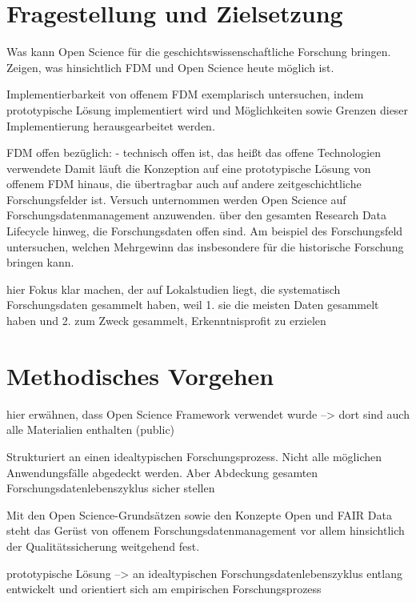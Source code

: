 \section{Fragestellung und Zielsetzung}

Was kann Open Science für die geschichtswissenschaftliche Forschung bringen. 
Zeigen, was hinsichtlich FDM und Open Science heute möglich ist.

Implementierbarkeit von offenem FDM exemplarisch untersuchen, indem prototypische Lösung implementiert wird und Möglichkeiten sowie Grenzen dieser Implementierung herausgearbeitet werden.   

FDM offen bezüglich:
- technisch offen ist, das heißt das offene Technologien verwendete
Damit läuft die Konzeption auf eine prototypische Lösung von offenem FDM hinaus, die übertragbar auch auf andere zeitgeschichtliche Forschungsfelder ist.
Versuch unternommen werden Open Science auf Forschungsdatenmanagement anzuwenden. über den gesamten Research Data Lifecycle hinweg, die Forschungsdaten offen sind. Am beispiel des Forschungsfeld untersuchen, welchen Mehrgewinn das insbesondere für die historische Forschung bringen kann. 

 hier Fokus klar machen, der auf Lokalstudien liegt, die systematisch Forschungsdaten gesammelt haben, weil 1. sie die meisten Daten gesammelt haben und 2. zum Zweck gesammelt, Erkenntnisprofit zu erzielen

\section{Methodisches Vorgehen}

hier erwähnen, dass Open Science Framework verwendet wurde --> dort sind auch alle Materialien enthalten (public)

Strukturiert an einen idealtypischen Forschungsprozess. Nicht alle möglichen Anwendungsfälle abgedeckt werden. Aber Abdeckung gesamten Forschungsdatenlebenszyklus sicher stellen

Mit den Open Science-Grundsätzen sowie den Konzepte Open und FAIR Data steht das Gerüst von offenem Forschungsdatenmanagement vor allem hinsichtlich der Qualitätssicherung weitgehend fest.

prototypische Lösung --> an idealtypischen Forschungsdatenlebenszyklus entlang entwickelt und orientiert sich am empirischen Forschungsprozess